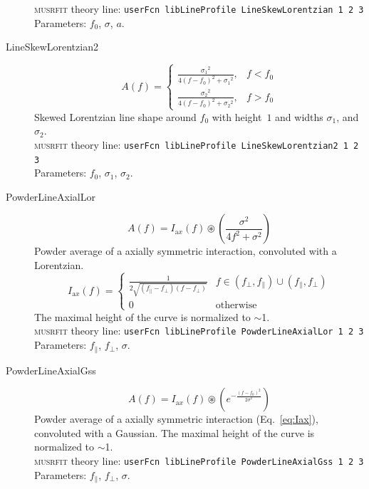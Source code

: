 \documentclass[twoside]{article}
\newcommand{\musrfit}{\textsc{musrfit}\xspace}
\begin{document}
\begin{description}
   \musrfit theory line: \verb?userFcn libLineProfile LineSkewLorentzian 1 2 3?
\\[1.5ex]
    Parameters: $f_0$, $\sigma$, $a$. 
        \item[LineSkewLorentzian2]
   \begin{equation}
    A(f)=  \left\{\begin{matrix}\frac{{\sigma_1}^2}{4{(f-f_0)}^2+{\sigma_1}^2},&f<f_0\\[9pt] \frac{{\sigma_2}^2}{4{(f-f_0)}^2+{\sigma_2}^2},&f>f_0\end{matrix}\right.
   \end{equation}
   Skewed Lorentzian line shape around $f_0$ with height~$1$ and  widths $\sigma_1$, 
 and $\sigma_2$.\\[1.5ex]
   \musrfit theory line: \verb?userFcn libLineProfile LineSkewLorentzian2 1 2 3?
\\[1.5ex]
    Parameters: $f_0$, $\sigma_1$, $\sigma_2$. 
    
    
\item[PowderLineAxialLor]
   \begin{equation}
    A(f)= I_{\mathrm ax}(f)\circledast\left( \frac{\sigma^2}{4f^2+\sigma^2} \right)
   \end{equation}
   Powder average of a axially symmetric interaction, convoluted with a Lorentzian. 
   \begin{equation}\label{eq:Iax}
      I_{\mathrm ax}(f)=\left\{\begin{matrix} \frac{1}{2\sqrt{(f_\parallel-f_\perp)(f-f_\perp)}}& f\in(f_\perp,f_\parallel)\cup(f_\parallel,f_\perp)\\[6pt] 0 & \text{otherwise}\end{matrix} \right.
   \end{equation}
   The maximal height of the curve is normalized to $\sim$1.
   \\[1.5ex]
   \musrfit theory line: \verb?userFcn libLineProfile PowderLineAxialLor 1 2 3?
\\[1.5ex]
    Parameters: $f_\parallel$, $f_\perp$, $\sigma$. 
      
\item[PowderLineAxialGss]
   \begin{equation}
    A(f)= I_{\mathrm ax}(f)\circledast\left( e^{-\frac{(f-f_0)^2}{2 \sigma^2}} \right)
   \end{equation}
   Powder average of a axially symmetric interaction (Eq.~\ref{eq:Iax}), convoluted with a Gaussian. The maximal height of the curve is normalized to $\sim$1.
   \\[1.5ex]
   \musrfit theory line: \verb?userFcn libLineProfile PowderLineAxialGss 1 2 3?
\\[1.5ex]
    Parameters: $f_\parallel$, $f_\perp$, $\sigma$. 


\end{description}
\end{document}
